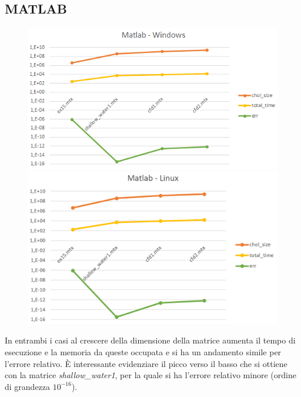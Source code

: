 \documentclass[a4paper,12pt]{article}
\begin{document}
\subsection{MATLAB}
\begin{figure}[H]
\centering
\begin{minipage}{.5\textwidth}
  \centering
  \includegraphics[width=1\linewidth]{img/matlabwin.png}
\end{minipage}%
\begin{minipage}{.5\textwidth}
  \centering
  \includegraphics[width=1\linewidth]{img/matlablinux.png}
\end{minipage}
\end{figure}
\bigskip

\fancyhf{}
\rhead{\leftmark}
\fancyfoot[C]{\thepage}

In entrambi i casi al crescere della dimensione della matrice aumenta il tempo di esecuzione e la memoria da queste occupata e si ha un andamento simile per l’errore relativo. È interessante evidenziare il picco verso il basso che si ottiene con la matrice \textit{shallow\_water1}, per la quale si ha l’errore relativo minore (ordine di grandezza $10^{-16}$).
\bigskip
\end{document}
